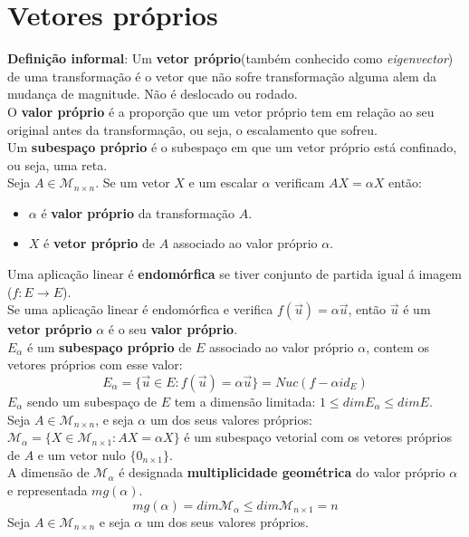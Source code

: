 \documentclass[]{report}
\begin{document}
\section{Vetores próprios}
\textbf{Definição informal}: Um \textbf{vetor próprio}(também conhecido como \textit{eigenvector}) de uma transformação é o vetor que não sofre transformação alguma alem da mudança de magnitude. Não é deslocado ou rodado.\\
O \textbf{valor próprio} é a proporção que um vetor próprio tem em relação ao seu original antes da transformação, ou seja, o escalamento que sofreu.\\
Um \textbf{subespaço próprio} é o subespaço em que um vetor próprio está confinado, ou seja, uma reta.\\[5mm]
Seja $A \in \mathcal{M}_{n \times n}$. Se um vetor $X$ e um escalar $\alpha$ verificam $AX = \alpha X$ então:
\begin{itemize}
\item $\alpha$ é \textbf{valor próprio} da transformação $A$.
\item $X$ é \textbf{vetor próprio} de $A$ associado ao valor próprio $\alpha$.
\end{itemize}
Uma aplicação linear é \textbf{endomórfica} se tiver conjunto de partida igual á imagem ($f: E \to E$).\\
Se uma aplicação linear é endomórfica e verifica $f(\vec u)= \alpha \vec u$, então $\vec u$ é um \textbf{vetor próprio} $\alpha$ é o seu \textbf{valor próprio}.\\
$E_\alpha$ é um \textbf{subespaço próprio} de $E$ associado ao valor próprio $\alpha$, contem os vetores próprios com esse valor:
$$E_\alpha = \{\vec u \in E : f(\vec u) = \alpha \vec u\} = Nuc(f-\alpha id_E)$$
$E_\alpha$ sendo um subespaço de $E$ tem a dimensão limitada: $1 \leq dim E_\alpha \leq dim E$.\\[2mm]
Seja $A \in \mathcal{M}_{n \times n}$, e seja $\alpha$ um dos seus valores próprios:\\
$\mathcal{M}_\alpha = \{X \in \mathcal{M}_{n \times 1} : AX = \alpha X\}$ é um subespaço vetorial com os vetores próprios de $A$ e um vetor nulo $\{0_{n \times 1}\}$.\\
A dimensão de $\mathcal{M}_{\alpha}$ é designada \textbf{multiplicidade geométrica} do valor próprio $\alpha$ e representada $mg(\alpha)$.
$$mg(\alpha) = dim \mathcal{M}_\alpha \leq dim \mathcal{M}_{n \times 1} = n$$
Seja $A \in \mathcal{M}_{n \times n}$ e seja $\alpha$ um dos seus valores próprios.\\
\end{document}
